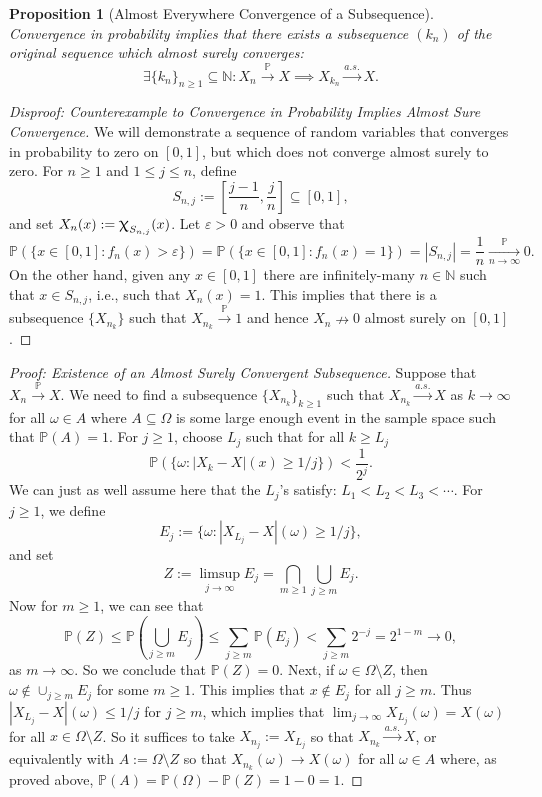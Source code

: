 \documentclass[12pt,reqno]{article}
\theoremstyle{plain}
\newtheorem{prop}[theorem]{Proposition}
\theoremstyle{definition}
\newcommand{\PP}[1]{\ensuremath{\mathbb{P}\left(#1\right)}}
\renewcommand{\chi}{\scalebox{1.25}{$\upchi$}}
\begin{document}
\begin{prop}[Almost Everywhere Convergence of a Subsequence] 
Convergence in probability implies that there exists a 
subsequence $(k_n)$ of the original sequence which almost surely 
converges:
\[
\exists \{k_n\}_{n \geq 1} \subseteq \mathbb{N}: 
X_n \xrightarrow{\mathbb{P}} X \implies X_{k_n} \xrightarrow{a.s.} X. 
\] 
\end{prop} 
\begin{proof}[Disproof: Counterexample to Convergence in Probability Implies Almost Sure Convergence]
We will demonstrate a sequence of random variables 
that converges in probability to zero on $[0,1]$, but which does 
not converge almost surely to zero. 
For $n \geq 1$ and $1 \leq j \leq n$, define 
\[
S_{n,j} := \left[\frac{j-1}{n}, \frac{j}{n}\right] \subseteq [0,1], 
\]
and set $X_n(x) := \chi_{S_{n,j}}(x)$. Let $\varepsilon > 0$ and observe that 
\[
\PP{\{x \in [0,1] : f_n(x) > \varepsilon\}} = \PP{\{x \in [0,1] : f_n(x) = 1\}} = 
     |S_{n,j}| = \frac{1}{n} \xrightarrow[n \rightarrow \infty]{\mathbb{P}} 0. 
\] 
On the other hand, given any $x \in [0, 1]$ there are 
infinitely-many $n \in \mathbb{N}$ such that $x \in S_{n,j}$, i.e., such that 
$X_n(x) = 1$. This implies that there is a 
subsequence $\{X_{n_k}\}$ such that $X_{n_k} \xrightarrow{\mathbb{P}} 1$ and hence 
$X_n \nrightarrow 0$ almost surely on $[0,1]$. 
\end{proof}
\begin{proof}[Proof: Existence of an Almost Surely Convergent Subsequence] 
Suppose that $X_n \xrightarrow{\mathbb{P}} X$. We need to find a subsequence $\{X_{n_k}\}_{k \geq 1}$ 
such that $X_{n_k} \xrightarrow{a.s.} X$ as $k \rightarrow \infty$ for all 
$\omega \in A$ 
where $A \subseteq \Omega$ is some large enough event in the sample space such that $\PP{A} = 1$. 
For $j \geq 1$, choose $L_j$ such that for all $k \geq L_j$ 
\[
\PP{\{\omega : |X_k-X|(x) \geq 1/j\}} < \frac{1}{2^j}. 
\]
We can just as well assume here that the $L_j$'s satisfy: $L_1 < L_2 < L_3 < \cdots$. 
For $j \geq 1$, we define 
\[
E_j := \{\omega : |X_{L_j}-X|(\omega) \geq 1/j\}, 
\]
and set 
\[
Z := \limsup_{j \rightarrow \infty} E_j = \bigcap_{m \geq 1} \bigcup_{j \geq m} E_j. 
\]
Now for $m \geq 1$, we can see that 
\[
\PP{Z} \leq \PP{\bigcup_{j \geq m} E_j} \leq \sum_{j \geq m} \PP{E_j} < 
     \sum_{j \geq m} 2^{-j} = 2^{1-m} \longrightarrow 0, 
\] 
as $m \rightarrow \infty$. So we conclude that $\PP{Z} = 0$. 
Next, if $\omega \in \Omega \setminus Z$, then $\omega \notin \cup_{j \geq m} E_j$ 
for some $m \geq 1$. 
This implies that $x \notin E_j$ for all $j \geq m$. Thus 
$|X_{L_j}-X|(\omega) \leq 1/j$ for $j \geq m$, which implies that 
$\lim_{j \rightarrow \infty} X_{L_j}(\omega) = X(\omega)$ for all 
$x \in \Omega \setminus Z$. 
So it suffices to take $X_{n_j} := X_{L_j}$ so that $X_{n_k} \xrightarrow{a.s.} X$, 
or equivalently with $A := \Omega \setminus Z$ so that 
$X_{n_k}(\omega) \longrightarrow X(\omega)$ for all $\omega \in A$ where, as proved above, 
$\PP{A} = \PP{\Omega} - \PP{Z} = 1 - 0 = 1$. 
\end{proof} 
\end{document}
